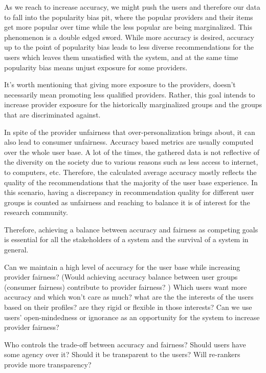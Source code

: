 As we reach to increase accuracy, we might push the users and therefore our data to fall into the popularity bias pit, where the popular providers and their items get more popular over time while the less popular are being marginalized. This phenomenon is a double edged sword. While more accuracy is desired, accuracy up to the point of popularity bias leads to less diverse recommendations for the users which leaves them unsatisfied with the system, and at the same time popularity bias means unjust exposure for some providers.

It's worth mentioning that giving more exposure to the providers, doesn't necessarily mean promoting less qualified providers. Rather, this goal intends to increase provider exposure for the historically marginalized groups and the groups that are discriminated against.

In spite of the provider unfairness that over-personalization brings about, it can also lead to consumer unfairness. Accuracy based metrics are usually computed over the whole user base. A lot of the times, the gathered data is not reflective of the diversity on the society due to various reasons such as less access to internet, to computers, etc. Therefore, the calculated average accuracy mostly reflects the quality of the recommendations that the majority of the user base experience. In this scenario, having a discrepancy in recommendation quality for different user groups is counted as unfairness and reaching to balance it is of interest for the research community.


Therefore, achieving a balance between accuracy and fairness as competing goals is essential for all the stakeholders of a system and the survival of a system in general.


Can we maintain a high level of accuracy for the user base while increasing provider fairness?
 (Would achieving accuracy balance between user groups (consumer fairness) contribute to provider fairness? )
 Which users want more accuracy and which won't care as much? what are the the interests of the users based on their profiles? are they rigid or flexible in those interests? Can we use users' open-mindedness or ignorance as an opportunity for the system to increase provider fairness?
 
 
Who controls the trade-off between accuracy and fairness? Should users have some agency over it? Should it be transparent to the users? Will re-rankers provide more transparency?









    







